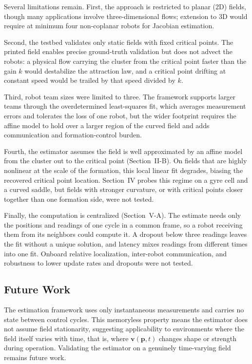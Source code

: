 \documentclass[lettersize,journal]{IEEEtran}
\begin{document}
Several limitations remain. First, the approach is restricted to planar (2D) fields, though many applications involve three-dimensional flows; extension to 3D would require at minimum four non-coplanar robots for Jacobian estimation.

Second, the testbed validates only static fields with fixed critical points. The printed field enables precise ground-truth validation but does not advect the robots: a physical flow carrying the cluster from the critical point faster than the gain $k$ would destabilize the attraction law, and a critical point drifting at constant speed would be trailed by that speed divided by $k$.

Third, robot team sizes were limited to three. The framework supports larger teams through the overdetermined least-squares fit, which averages measurement errors and tolerates the loss of one robot, but the wider footprint requires the affine model to hold over a larger region of the curved field and adds communication and formation-control burden.

Fourth, the estimator assumes the field is well approximated by an affine model from the cluster out to the critical point (Section~II-B). On fields that are highly nonlinear at the scale of the formation, this local linear fit degrades, biasing the recovered critical point location. Section~IV probes this regime on a gyre cell and a curved saddle, but fields with stronger curvature, or with critical points closer together than one formation side, were not tested.

Finally, the computation is centralized (Section~V-A). The estimate needs only the positions and readings of one cycle in a common frame, so a robot receiving them from its neighbors could compute it. A dropout below three readings leaves the fit without a unique solution, and latency mixes readings from different times into one fit. Onboard relative localization, inter-robot communication, and robustness to lower update rates and dropouts were not tested.

\subsection{Future Work}

The estimation framework uses only instantaneous measurements and carries no state between control cycles. This memoryless property means the estimator does not assume field stationarity, suggesting applicability to environments where the field itself varies with time, that is, where $\mathbf{v}(\mathbf{p}, t)$ changes shape or strength during operation. Validating the estimator on a genuinely time-varying field remains future work.
\end{document}
